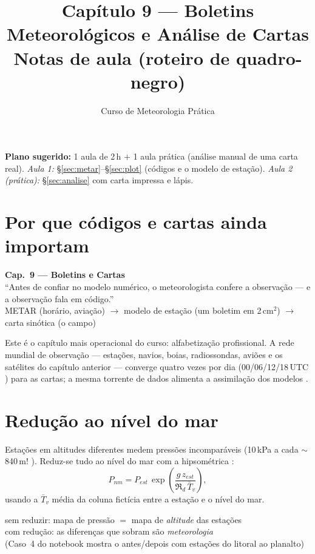 \documentclass[11pt]{article}
\title{Capítulo 9 --- Boletins Meteorológicos e Análise de Cartas\\
{\large Notas de aula (roteiro de quadro-negro)}}
\author{Curso de Meteorologia Prática}
\date{}
\begin{document}
\maketitle
\thispagestyle{fancy}

\noindent\textbf{Plano sugerido:} 1 aula de 2\,h $+$ 1 aula prática
(análise manual de uma carta real).
\emph{Aula 1:} \S\ref{sec:metar}--\S\ref{sec:plot} (códigos e o modelo
de estação).
\emph{Aula 2 (prática):} \S\ref{sec:analise} com carta impressa e lápis.

\section{Por que códigos e cartas ainda importam}

\begin{noquadro}[abertura]
\textbf{Cap.~9 --- Boletins e Cartas}\\[2pt]
``Antes de confiar no modelo numérico, o meteorologista confere a
observação — e a observação fala em código.''\\[2pt]
METAR (horário, aviação) $\to$ modelo de estação (um boletim em
2\,cm$^2$) $\to$ carta sinótica (o campo)
\end{noquadro}

Este é o capítulo mais operacional do curso: alfabetização profissional.
A rede mundial de observação — estações, navios, boias, radiossondas,
aviões e os satélites do capítulo anterior  —
converge quatro vezes por dia (00/06/12/18\,UTC
) para as cartas; a mesma torrente de dados
alimenta a assimilação dos modelos .

\section{Redução ao nível do mar}\label{sec:reducao}

\begin{formadif}
Estações em altitudes diferentes medem pressões incomparáveis (10\,kPa
a cada $\sim$840\,m! ). Reduz-se tudo ao nível
do mar com a hipsométrica :
\[ P_{nm} = P_{est}\,\exp\!\left(\frac{g\,z_{est}}{\Re_d\,\bar T_v}\right), \]
usando a $\bar T_v$ média da coluna fictícia entre a estação e o nível
do mar.
\end{formadif}

\begin{noquadro}
sem reduzir: mapa de pressão $=$ mapa de \emph{altitude} das estações\\
com redução: as diferenças que sobram são \emph{meteorologia}\\[2pt]
(Caso~4 do notebook mostra o antes/depois com estações do litoral ao
planalto)
\end{noquadro}
\end{document}
